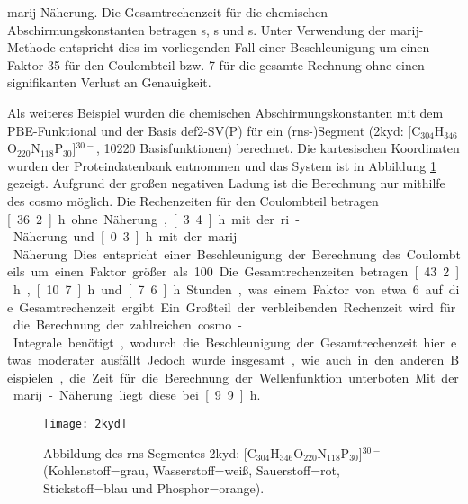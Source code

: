 \ac{marij}-Näherung. Die Gesamtrechenzeit für die chemischen Abschirmungskonstanten betragen \unit[4610]{s}, \unit[741]{s} und \unit[633]{s}. Unter Verwendung der \ac{marij}-Methode entspricht dies im vorliegenden Fall einer Beschleunigung um einen Faktor 35 für den Coulombteil bzw. 7 für die gesamte Rechnung ohne einen signifikanten Verlust an Genauigkeit. 

Als weiteres Beispiel wurden die chemischen Abschirmungskonstanten mit dem PBE-Funktional und der Basis def2-SV(P) für ein \mbox{(\acs{rns}-)}Segment (2kyd\supercite{2kydstructure}: [C$_{304}$H$_{346}$O$_{220}$N$_{118}$P$_{30}$]$^{30-}$, 10220 Basisfunktionen) berechnet. Die kartesischen Koordinaten wurden der Proteindatenbank entnommen und das System ist in Abbildung \ref{abb:2kyd} gezeigt. Aufgrund der großen negativen Ladung ist die Berechnung nur mithilfe des \ac{cosmo} möglich. Die Rechenzeiten für den Coulombteil betragen \unit[36.2]{h} ohne Näherung, \unit[3.4]{h} mit der \ac{ri}-Näherung und \unit[0.3]{h} mit der \ac{marij}-Näherung. Dies entspricht einer Beschleunigung der Berechnung des Coulombteils um einen Faktor größer als 100. Die Gesamtrechenzeiten betragen \unit[43.2]{h}, \unit[10.7]{h} und \unit[7.6]{h} Stunden, was einem Faktor von etwa 6 auf die Gesamtrechenzeit ergibt. Ein Großteil der verbleibenden Rechenzeit wird für die Berechnung der zahlreichen \ac{cosmo}-Integrale benötigt, wodurch die Beschleunigung der Gesamtrechenzeit hier etwas moderater ausfällt. Jedoch wurde insgesamt, wie auch in den anderen Beispielen, die Zeit für die Berechnung der Wellenfunktion unterboten. Mit der \ac{marij}-Näherung liegt diese bei \unit[9.9]{h}.

\begin{figure}[ht!]
	\centering
	\texttt{[image: 2kyd]}
	\captionsetup{figurewithin = chapter}
	\captionsetup{font=small, labelfont=bf}\caption[{Abbildung eines \ac{rns}-Segmentes}]{Abbildung des \ac{rns}-Segmentes 2kyd\supercite{2kydstructure}: [C$_{304}$H$_{346}$O$_{220}$N$_{118}$P$_{30}$]$^{30-}$ (Kohlenstoff=grau, Wasserstoff=weiß, Sauerstoff=rot, Stickstoff=blau und Phosphor=orange).}
\label{abb:2kyd}
\end{figure}

